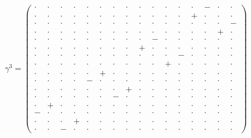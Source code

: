 \documentclass[
  10pt,
]{article}
\begin{document}
\[\gamma^3=\left(\begin{smallmatrix} \cdot & \cdot & \cdot & \cdot & \cdot & \cdot & \cdot & \cdot & \cdot & \cdot & \cdot & \cdot & \cdot & - & \cdot & \cdot \\ \cdot & \cdot & \cdot & \cdot & \cdot & \cdot & \cdot & \cdot & \cdot & \cdot & \cdot & \cdot & + & \cdot & \cdot & \cdot \\ \cdot & \cdot & \cdot & \cdot & \cdot & \cdot & \cdot & \cdot & \cdot & \cdot & \cdot & \cdot & \cdot & \cdot & \cdot & - \\ \cdot & \cdot & \cdot & \cdot & \cdot & \cdot & \cdot & \cdot & \cdot & \cdot & \cdot & \cdot & \cdot & \cdot & + & \cdot \\ \cdot & \cdot & \cdot & \cdot & \cdot & \cdot & \cdot & \cdot & \cdot & - & \cdot & \cdot & \cdot & \cdot & \cdot & \cdot \\ \cdot & \cdot & \cdot & \cdot & \cdot & \cdot & \cdot & \cdot & + & \cdot & \cdot & \cdot & \cdot & \cdot & \cdot & \cdot \\ \cdot & \cdot & \cdot & \cdot & \cdot & \cdot & \cdot & \cdot & \cdot & \cdot & \cdot & - & \cdot & \cdot & \cdot & \cdot \\ \cdot & \cdot & \cdot & \cdot & \cdot & \cdot & \cdot & \cdot & \cdot & \cdot & + & \cdot & \cdot & \cdot & \cdot & \cdot \\ \cdot & \cdot & \cdot & \cdot & \cdot & + & \cdot & \cdot & \cdot & \cdot & \cdot & \cdot & \cdot & \cdot & \cdot & \cdot \\ \cdot & \cdot & \cdot & \cdot & - & \cdot & \cdot & \cdot & \cdot & \cdot & \cdot & \cdot & \cdot & \cdot & \cdot & \cdot \\ \cdot & \cdot & \cdot & \cdot & \cdot & \cdot & \cdot & + & \cdot & \cdot & \cdot & \cdot & \cdot & \cdot & \cdot & \cdot \\ \cdot & \cdot & \cdot & \cdot & \cdot & \cdot & - & \cdot & \cdot & \cdot & \cdot & \cdot & \cdot & \cdot & \cdot & \cdot \\ \cdot & + & \cdot & \cdot & \cdot & \cdot & \cdot & \cdot & \cdot & \cdot & \cdot & \cdot & \cdot & \cdot & \cdot & \cdot \\ - & \cdot & \cdot & \cdot & \cdot & \cdot & \cdot & \cdot & \cdot & \cdot & \cdot & \cdot & \cdot & \cdot & \cdot & \cdot \\ \cdot & \cdot & \cdot & + & \cdot & \cdot & \cdot & \cdot & \cdot & \cdot & \cdot & \cdot & \cdot & \cdot & \cdot & \cdot \\ \cdot & \cdot & - & \cdot & \cdot & \cdot & \cdot & \cdot & \cdot & \cdot & \cdot & \cdot & \cdot & \cdot & \cdot & \cdot \end{smallmatrix}\right)\]
\end{document}
